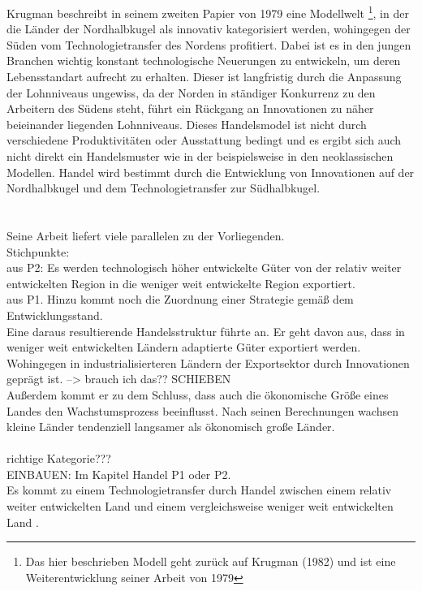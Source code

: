 Krugman beschreibt in seinem zweiten Papier von 1979 eine Modellwelt \footnote{Das hier beschrieben Modell geht zurück auf Krugman (1982) und ist eine Weiterentwicklung seiner Arbeit von 1979}, in der die L{\"a}nder der Nordhalbkugel als innovativ kategorisiert werden, wohingegen der S{\"u}den vom Technologietransfer des Nordens profitiert. Dabei ist es in den jungen Branchen wichtig konstant technologische Neuerungen zu entwickeln, um deren Lebensstandart aufrecht zu erhalten. Dieser ist langfristig durch die Anpassung der Lohnniveaus ungewiss, da der Norden in st{\"a}ndiger Konkurrenz zu den Arbeitern des S{\"u}dens steht, f{\"u}hrt ein R{\"u}ckgang an Innovationen zu n{\"a}her beieinander liegenden Lohnniveaus. Dieses Handelsmodel ist nicht durch verschiedene Produktivit{\"a}ten oder Ausstattung bedingt und es ergibt sich auch nicht direkt ein Handelsmuster wie in der beispielsweise in den neoklassischen Modellen.  Handel wird bestimmt durch die Entwicklung von Innovationen auf der Nordhalbkugel und dem Technologietransfer zur S{\"u}dhalbkugel. \\ \\ \\ Seine Arbeit liefert viele parallelen zu der Vorliegenden. \\ Stichpunkte:\\ aus P2: Es werden technologisch h{\"o}her entwickelte G{\"u}ter von der relativ weiter entwickelten Region in die weniger weit entwickelte Region exportiert. \\ aus P1. Hinzu kommt noch die Zuordnung einer Strategie gem{\"a}{\ss} dem Entwicklungsstand. \\
%
Eine daraus resultierende Handelsstruktur führte \cite{Krugman.1979ab} an. Er geht davon aus, dass in weniger weit entwickelten L{\"a}ndern adaptierte G{\"u}ter exportiert werden. Wohingegen in industrialisierteren L{\"a}ndern der Exportsektor durch Innovationen gepr{\"a}gt ist. \cite{Krugman.1979ab}--> brauch ich das??
%
\textcolor[rgb]{0.2,0.8,0.2}{SCHIEBEN\\
 Au{\ss}erdem kommt er zu dem Schluss, dass auch die {\"o}konomische Gr{\"o}{\ss}e eines Landes den Wachstumsprozess beeinflusst. Nach seinen Berechnungen wachsen kleine L{\"a}nder tendenziell langsamer als {\"o}konomisch gro{\ss}e L{\"a}nder. \\ \\ richtige Kategorie???~\cite{Romer.1986}}\\
%
\textcolor[rgb]{0.2,0.8,0.2}{EINBAUEN: Im Kapitel Handel P1 oder P2.\\
Es kommt zu einem Technologietransfer durch Handel zwischen einem relativ weiter entwickelten Land und einem vergleichsweise weniger weit entwickelten Land \cite{Findlay.1978}.}
